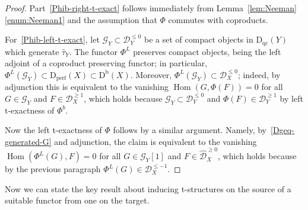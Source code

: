 \documentclass[11pt, reqno]{amsart}
\numberwithin{equation}{section}
\theoremstyle{plain}
\theoremstyle{remark}
\theoremstyle{definition}
\theoremstyle{italicsname}
\newcommand{\Db}{\mathrm{D^b}}
\newcommand{\Dperf}{\mathrm{D}_{\mathrm{perf}}}
\newcommand{\Dqc}{\mathrm{D}_{\mathrm{qc}}}
\DeclareMathOperator{\Hom}{Hom}
\newcommand{\cG}{\mathcal{G}}
\newcommand{\cD}{\mathscr{D}}
\begin{document}
\begin{proof}
    Part~\ref{Phib-right-t-exact} follows immediately from Lemma~\ref{lem:Neeman}\ref{enum:Neeman1} and the assumption that $\Phi$ commutes with coproducts. 

    For~\ref{Phib-left-t-exact}, 
    let $\cG_Y \subset \cD_Y^{\leq 0}$ be a set of compact objects in $\Dqc(Y)$ which generate $\widehat{\tau}_Y$. 
    The functor $\Phi^L$ preserves compact objects, being the left adjoint of a coproduct preserving functor; in particular, $\Phi^L(\cG_Y) \subset \Dperf(X) \subset \Db(X)$. 
    Moreover, $\Phi^L(\cG_Y) \subset \cD_X^{\leq 0}$; indeed, by adjunction this is equivalent to the vanishing $\Hom(G, \Phi(F)) = 0$ for all $G \in \cG_Y$ and $F \in \cD_X^{ \geq 1}$, which holds because $\cG_Y \subset \cD_Y^{\leq 0}$ and $\Phi(F) \in \cD_Y^{\geq 1}$ by left t-exactness of $\Phi^b$. 
    
    Now the left t-exactness of $\Phi$ follows by a similar argument. Namely, by~\eqref{Dgeq-generated-G} and adjunction, the claim is equivalent to the vanishing  $\Hom(\Phi^L(G), F) = 0$ for all $G \in \cG_Y[1]$ and $F \in \widehat{\cD}_X^{\geq 0}$, which holds because by the previous paragraph $\Phi^L(G) \in \cD_X^{\leq -1}$.     
\end{proof}

Now we can state the key result about inducing t-structures on the source of a suitable functor from one on the target. 
\end{document}
